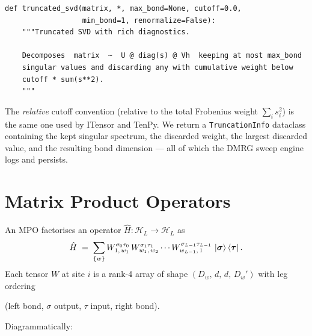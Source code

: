 \documentclass[11pt,a4paper]{article}
\theoremstyle{plain}
\theoremstyle{definition}
\theoremstyle{remark}
\newcommand{\Hilb}{\mathcal{H}}
\renewcommand{\op}[1]{\hat{#1}}
\newcommand{\dphys}{d}
\newcommand{\Dmpo}{D_{\!w}}
\begin{document}
\begin{lstlisting}
def truncated_svd(matrix, *, max_bond=None, cutoff=0.0,
                  min_bond=1, renormalize=False):
    """Truncated SVD with rich diagnostics.

    Decomposes  matrix  ~  U @ diag(s) @ Vh  keeping at most max_bond
    singular values and discarding any with cumulative weight below
    cutoff * sum(s**2).
    """
\end{lstlisting}

The \emph{relative} cutoff convention (relative to the total Frobenius weight
$\sum_i s_i^2$) is the same one used by ITensor and TenPy.  We return a
\texttt{TruncationInfo} dataclass containing the kept singular spectrum, the
discarded weight, the largest discarded value, and the resulting bond
dimension --- all of which the DMRG sweep engine logs and persists.


\section{Matrix Product Operators}
\label{sec:mpo}

An MPO factorises an operator $\op H : \Hilb_L \to \Hilb_L$ as
\begin{equation}
  \op H \;=\; \sum_{\{w\}}
    W^{\sigma_0 \tau_0}_{1,\,w_1}\,
    W^{\sigma_1 \tau_1}_{w_1,\,w_2} \cdots
    W^{\sigma_{L-1} \tau_{L-1}}_{w_{L-1},\,1}\,
    \ket{\bm\sigma}\bra{\bm\tau}.
\end{equation}
Each tensor $W$ at site $i$ is a rank-4 array of shape
$(\Dmpo,\,\dphys,\,\dphys,\,\Dmpo')$ with leg ordering
\smallskip
\begin{center}\small
  (left bond, $\sigma$ output, $\tau$ input, right bond).
\end{center}
\smallskip
Diagrammatically:

\begin{center}
\end{center}
\end{document}
